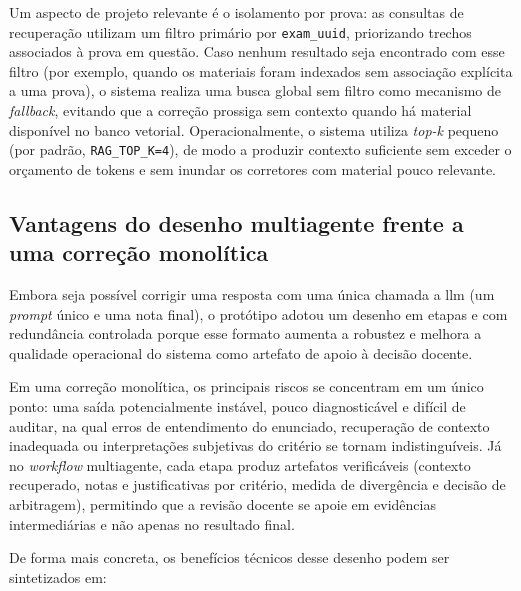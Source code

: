 Um aspecto de projeto relevante é o isolamento por prova: as consultas de recuperação utilizam um filtro primário por \texttt{exam\_uuid}, priorizando trechos associados à prova em questão. Caso nenhum resultado seja encontrado com esse filtro (por exemplo, quando os materiais foram indexados sem associação explícita a uma prova), o sistema realiza uma busca global sem filtro como mecanismo de \textit{fallback}, evitando que a correção prossiga sem contexto quando há material disponível no banco vetorial. Operacionalmente, o sistema utiliza \textit{top-k} pequeno (por padrão, \texttt{RAG\_TOP\_K=4}), de modo a produzir contexto suficiente sem exceder o orçamento de tokens e sem inundar os corretores com material pouco relevante.

\subsection{Vantagens do desenho multiagente frente a uma correção monolítica}

Embora seja possível corrigir uma resposta com uma única chamada a \gls{llm} (um \textit{prompt} único e uma nota final), o protótipo adotou um desenho em etapas e com redundância controlada porque esse formato aumenta a robustez e melhora a qualidade operacional do sistema como artefato de apoio à decisão docente.

Em uma correção monolítica, os principais riscos se concentram em um único ponto: uma saída potencialmente instável, pouco diagnosticável e difícil de auditar, na qual erros de entendimento do enunciado, recuperação de contexto inadequada ou interpretações subjetivas do critério se tornam indistinguíveis. Já no \textit{workflow} multiagente, cada etapa produz artefatos verificáveis (contexto recuperado, notas e justificativas por critério, medida de divergência e decisão de arbitragem), permitindo que a revisão docente se apoie em evidências intermediárias e não apenas no resultado final.

De forma mais concreta, os benefícios técnicos desse desenho podem ser sintetizados em:

